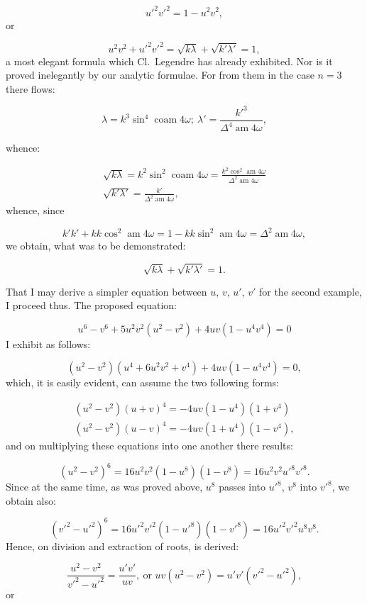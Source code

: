 \documentclass{article}
\begin{document}
\[
u'^{2}v'^{2}=1-u^{2}v^{2},
\]
or

\[
u^{2}v^{2}+u'^{2}v'^{2}=\sqrt{k\lambda}+\sqrt{k'\lambda'}=1,
\]
a most elegant formula which Cl.\ Legendre has already exhibited. Nor is it proved inelegantly by our analytic formulae. For from them in the case $n=3$ there flows:

\[
\lambda=k^{3}\sin^{4}\operatorname{coam}4\omega;\ \lambda'=\frac{k'^{3}}{\Delta^{4}\operatorname{am}4\omega},
\]

whence:

\[
\begin{gathered}
\sqrt{k\lambda}=k^{2}\sin^{2}\operatorname{coam}4\omega=\frac{k^{2}\cos^{2}\operatorname{am}4\omega}{\Delta^{2}\operatorname{am}4\omega}\\[1.5ex]
\sqrt{k'\lambda'}=\frac{k'}{\Delta^{2}\operatorname{am}4\omega},
\end{gathered}
\]
whence, since

\[
k'k'+kk\cos^{2}\operatorname{am}4\omega=1-kk\sin^{2}\operatorname{am}4\omega=\Delta^{2}\operatorname{am}4\omega,
\]
we obtain, what was to be demonstrated:

\[
\sqrt{k\lambda}+\sqrt{k'\lambda'}=1.
\]

That I may derive a simpler equation between $u$, $v$, $u'$, $v'$ for the second example, I proceed thus. The proposed equation:

\[
u^{6}-v^{6}+5u^{2}v^{2}(u^{2}-v^{2})+4uv(1-u^{4}v^{4})=0
\]
I exhibit as follows:

\[
(u^{2}-v^{2})(u^{4}+6u^{2}v^{2}+v^{4})+4uv(1-u^{4}v^{4})=0,
\]
which, it is easily evident, can assume the two following forms:

\[
\begin{gathered}
(u^{2}-v^{2})(u+v)^{4}=-4uv(1-u^{4})(1+v^{4})\\
(u^{2}-v^{2})(u-v)^{4}=-4uv(1+u^{4})(1-v^{4}),
\end{gathered}
\]
and on multiplying these equations into one another there results:

\[
(u^{2}-v^{2})^{6}=16u^{2}v^{2}(1-u^{8})(1-v^{8})=16u^{2}v^{2}u'^{8}v'^{8}.
\]
Since at the same time, as was proved above, $u^{8}$ passes into $u'^{8}$, $v^{8}$ into $v'^{8}$, we obtain also:

\[
(v'^{2}-u'^{2})^{6}=16u'^{2}v'^{2}(1-u'^{8})(1-v'^{8})=16u'^{2}v'^{2}u^{8}v^{8}.
\]
Hence, on division and extraction of roots, is derived:

\[
\frac{u^{2}-v^{2}}{v'^{2}-u'^{2}}=\frac{u'v'}{uv},\ \text{or }uv(u^{2}-v^{2})=u'v'(v'^{2}-u'^{2}),
\]
or
\end{document}
